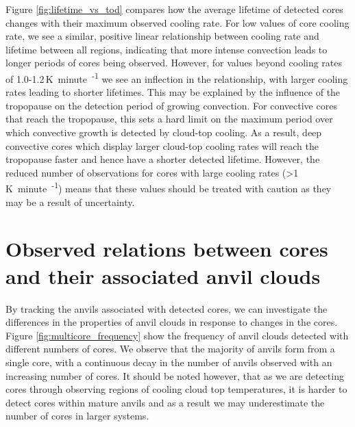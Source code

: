 Figure \ref{fig:lifetime_vs_tod} compares how the average lifetime of detected cores changes with their maximum observed cooling rate.
For low values of core cooling rate, we see a similar, positive linear relationship between cooling rate and lifetime between all regions, indicating that more intense convection leads to longer periods of cores being observed.
However, for values beyond cooling rates of 1.0-1.2\,\unit{K minute\textsuperscript{-1}} we see an inflection in the relationship, with larger cooling rates leading to shorter lifetimes.
This may be explained by the influence of the tropopause on the detection period of growing convection.
For convective cores that reach the tropopause, this sets a hard limit on the maximum period over which convective growth is detected by cloud-top cooling.
As a result, deep convective cores which display larger cloud-top cooling rates will reach the tropopause faster and hence have a shorter detected lifetime.
However, the reduced number of observations for cores with large cooling rates (>1\,\unit{K minute\textsuperscript{-1}}) means that these values should be treated with caution as they may be a result of uncertainty.



\section{Observed relations between cores and their associated anvil clouds}

By tracking the anvils associated with detected cores, we can investigate the differences in the properties of anvil clouds in response to changes in the cores.
Figure \ref{fig:multicore_frequency} show the frequency of anvil clouds detected with different numbers of cores.
We observe that the majority of anvils form from a single core, with a continuous decay in the number of anvils observed with an increasing number of cores.
It should be noted however, that as we are detecting cores through observing regions of cooling cloud top temperatures, it is harder to detect cores within mature anvils and as a result we may underestimate the number of cores in larger systems.

